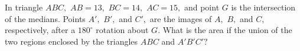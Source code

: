 In triangle $ABC,$ $AB=13,$ $BC=14,$ $AC=15,$ and point $G$ is the intersection of the medians. Points $A',$ $B',$ and $C',$ are the images of $A,$ $B,$ and $C,$ respectively, after a $180^\circ$ rotation about $G.$ What is the area if the union of the two regions enclosed by the triangles $ABC$ and $A'B'C'?$